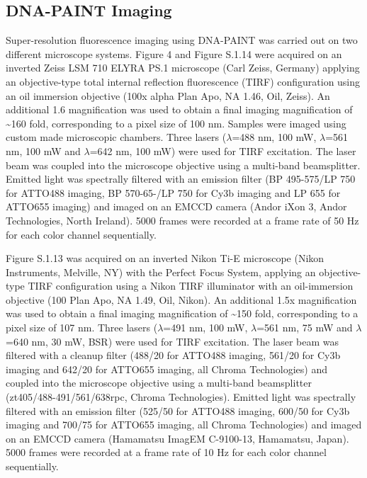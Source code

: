 \subsection{DNA-PAINT Imaging}
Super-resolution fluorescence imaging using DNA-PAINT was carried out on two different microscope systems. Figure 4 and Figure S.1.14 were acquired on an inverted Zeiss LSM 710 ELYRA PS.1 microscope (Carl Zeiss, Germany) applying an objective-type total internal reflection fluorescence (TIRF) configuration using an oil immersion objective (100x alpha Plan Apo, NA 1.46, Oil, Zeiss). An additional 1.6 magnification was used to obtain a final imaging magnification of \textasciitilde160 fold, corresponding to a pixel size of 100 nm. Samples were imaged using custom made microscopic chambers. Three lasers ($\lambda$=488 nm, 100 mW, $\lambda$=561 nm, 100 mW and $\lambda$=642 nm, 100 mW) were used for TIRF excitation. The laser beam was coupled into the microscope objective using a multi-band beamsplitter. Emitted light was spectrally filtered with an emission filter (BP 495-575/LP 750 for ATTO488 imaging, BP 570-65-/LP 750 for Cy3b imaging and LP 655 for ATTO655 imaging) and imaged on an EMCCD camera (Andor iXon 3, Andor Technologies, North Ireland). 5000 frames were recorded at a frame rate of 50 Hz for each color channel sequentially.

Figure S.1.13 was acquired on an inverted Nikon Ti-E microscope (Nikon Instruments, Melville, NY) with the Perfect Focus System, applying an objective-type TIRF configuration using a Nikon TIRF illuminator with an oil-immersion objective (100 Plan Apo, NA 1.49, Oil, Nikon). An additional 1.5x magnification was used to obtain a final imaging magnification of \textasciitilde150 fold, corresponding to a pixel size of 107 nm. Three lasers ($\lambda$=491 nm, 100 mW, $\lambda$=561 nm, 75 mW and $\lambda$=640 nm, 30 mW, BSR) were used for TIRF excitation. The laser beam was filtered with a cleanup filter (488/20 for ATTO488 imaging, 561/20 for Cy3b imaging and 642/20 for ATTO655 imaging, all Chroma Technologies) and coupled into the microscope objective using a multi-band beamsplitter (zt405/488-491/561/638rpc, Chroma Technologies). Emitted light was spectrally filtered with an emission filter (525/50 for ATTO488 imaging, 600/50 for Cy3b imaging and 700/75 for ATTO655 imaging, all Chroma Technologies) and imaged on an EMCCD camera (Hamamatsu ImagEM C-9100-13, Hamamatsu, Japan). 5000 frames were recorded at a frame rate of 10 Hz for each color channel sequentially. 

